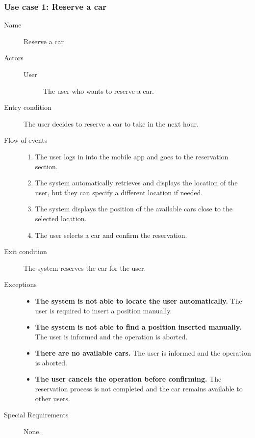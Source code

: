 	\subsubsection{Use case 1: Reserve a car}
		\begin{description}
			\item[Name] Reserve a car
			\item[Actors] \hfill
				\begin{description}
					\item[User] The user who wants to reserve a car.
				\end{description}
			\item[Entry condition] The user decides to reserve a car to take in the next hour.
			\item[Flow of events] \hfill
				\begin{enumerate}
					\item The user logs in into the mobile app and goes to the reservation section. \item The system automatically retrieves and displays the location of the user, but they can specify a different location if needed.
					\item The system displays the position of the available cars close to the selected location.
					\item The user selects a car and confirm the reservation.
				\end{enumerate}
			\item[Exit condition] The system reserves the car for the user.
			\item[Exceptions] \hfill
				\begin{itemize}
					\item \textbf{The system is not able to locate the user automatically.} The user is required to insert a position manually.
					\item \textbf{The system is not able to find a position inserted manually.} The user is informed and the operation is aborted.
					\item \textbf{There are no available cars.} The user is informed and the operation is aborted.
					\item \textbf{The user cancels the operation before confirming.} The reservation process is not completed and the car remains available to other users.
				\end{itemize}
			\item[Special Requirements] None.
		\end{description}

